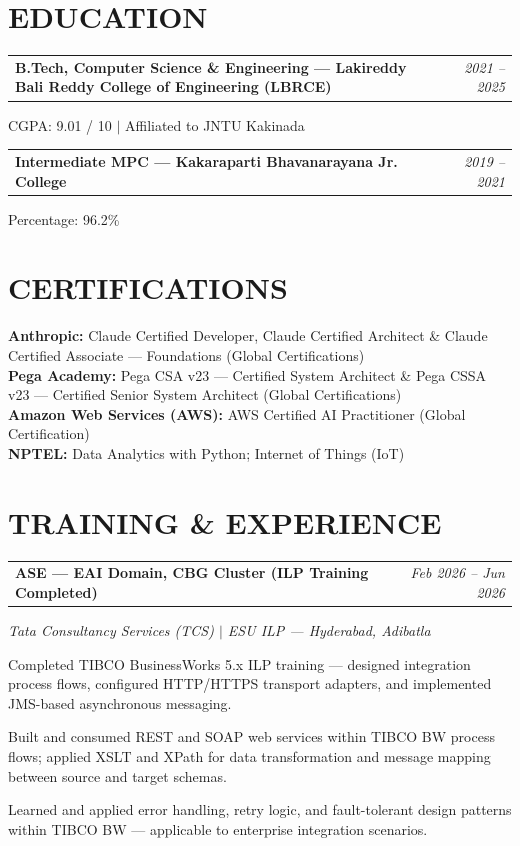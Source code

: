 \documentclass[10pt]{article}
\makeatletter
\newcommand{\entryrow}[3]{%
  \noindent\begin{tabularx}{\dimexpr\linewidth}{@{}X r@{}}
    \textbf{#1} & {\fontsize{9}{10.5}\selectfont\itshape\color{graytext}#2}\\
  \end{tabularx}%
  #3
}
\makeatother
\begin{document}
\section{EDUCATION}
\entryrow{B.Tech, Computer Science \& Engineering — Lakireddy Bali Reddy College of Engineering (LBRCE)}{2021 -- 2025}{}
CGPA: 9.01 / 10 $|$ Affiliated to JNTU Kakinada

\vspace{2pt}
\entryrow{Intermediate MPC — Kakaraparti Bhavanarayana Jr. College}{2019 -- 2021}{}
Percentage: 96.2\%

\section{CERTIFICATIONS}
\textbf{\color{navy}Anthropic:} Claude Certified Developer, Claude Certified Architect \& Claude Certified Associate — Foundations (Global Certifications)\\[2pt]
\textbf{\color{navy}Pega Academy:} Pega CSA v23 — Certified System Architect \& Pega CSSA v23 — Certified Senior System Architect (Global Certifications)\\[2pt]
\textbf{\color{navy}Amazon Web Services (AWS):} AWS Certified AI Practitioner (Global Certification)\\[2pt]
\textbf{\color{navy}NPTEL:} Data Analytics with Python; Internet of Things (IoT)

\section{TRAINING \& EXPERIENCE}
\entryrow{ASE — EAI Domain, CBG Cluster (ILP Training Completed)}{Feb 2026 -- Jun 2026}{}
{\fontsize{9}{10.5}\selectfont\itshape\color{accentblue} Tata Consultancy Services (TCS) $|$ ESU ILP — Hyderabad, Adibatla}
\begin{tightitemize}
\item Completed TIBCO BusinessWorks 5.x ILP training — designed integration process flows, configured HTTP/HTTPS transport adapters, and implemented JMS-based asynchronous messaging.
\item Built and consumed REST and SOAP web services within TIBCO BW process flows; applied XSLT and XPath for data transformation and message mapping between source and target schemas.
\item Learned and applied error handling, retry logic, and fault-tolerant design patterns within TIBCO BW — applicable to enterprise integration scenarios.
\end{tightitemize}
\end{document}
